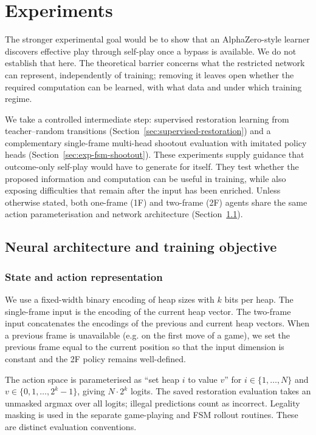 \documentclass[twoside,11pt]{article}
\numberwithin{theorem}{section}
\numberwithin{equation}{section}
\begin{document}
\section{Experiments}
\label{sec:experiments}

The stronger experimental goal would be to show that an AlphaZero-style learner discovers effective play through self-play once a bypass is available. We do not establish that here. The theoretical barrier concerns what the restricted network can represent, independently of training; removing it leaves open whether the required computation can be learned, with what data and under which training regime.

We take a controlled intermediate step: supervised restoration learning from teacher--random transitions (Section~\ref{sec:supervised-restoration}) and a complementary single-frame multi-head shootout evaluation with imitated policy heads (Section~\ref{sec:exp-fsm-shootout}). These experiments supply guidance that outcome-only self-play would have to generate for itself. They test whether the proposed information and computation can be useful in training, while also exposing difficulties that remain after the input has been enriched.
Unless otherwise stated, both one-frame (1F) and two-frame (2F) agents share the same action parameterisation and network architecture (Section~\ref{sec:arch}).

\subsection{Neural architecture and training objective}
\label{sec:arch}

\subsubsection{State and action representation}
\label{sec:state-action-repr}
We use a fixed-width binary encoding of heap sizes with $k$ bits per heap. The single-frame input is the encoding of the current heap vector. The two-frame input concatenates the encodings of the previous and current heap vectors. When a previous frame is unavailable (e.g. on the first move of a game), we set the previous frame equal to the current position so that the input dimension is constant and the 2F policy remains well-defined.

The action space is parameterised as ``set heap $i$ to value $v$'' for $i\in\{1,\dots,N\}$ and $v\in\{0,1,\dots,2^k-1\}$, giving $N\cdot 2^k$ logits. The saved restoration evaluation takes an unmasked argmax over all logits; illegal predictions count as incorrect. Legality masking is used in the separate game-playing and FSM rollout routines. These are distinct evaluation conventions.
\end{document}
